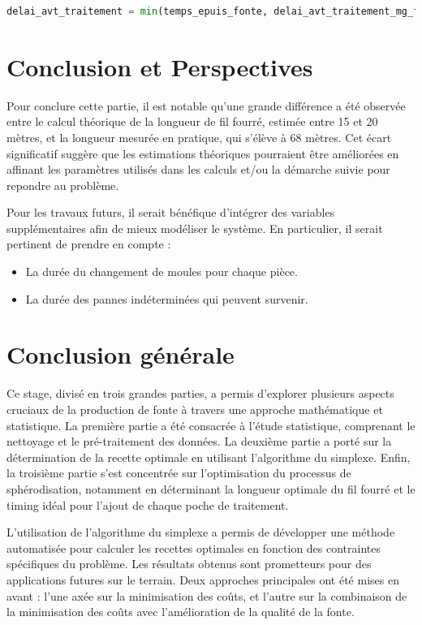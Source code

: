 \documentclass[12pt]{article}
\begin{document}
\begin{lstlisting}[language=Python, caption=Calcul du délai avant traitement optimal]
delai_avt_traitement = min(temps_epuis_fonte, delai_avt_traitement_mg_four)
\end{lstlisting}


\section*{Conclusion et Perspectives}

Pour conclure cette partie, il est notable qu'une grande différence a 
été observée entre le calcul théorique de la longueur de fil fourré, 
estimée entre 15 et 20 mètres, et la longueur mesurée en pratique, qui 
s'élève à 68 mètres. Cet écart significatif suggère que les estimations 
théoriques pourraient être améliorées en affinant les paramètres utilisés 
dans les calculs et/ou la démarche suivie pour repondre au problème.

Pour les travaux futurs, il serait bénéfique d'intégrer des variables 
supplémentaires afin de mieux modéliser le système. En particulier, il 
serait pertinent de prendre en compte :
\begin{itemize}
    \item La durée du changement de moules pour chaque pièce.
    \item La durée des pannes indéterminées qui peuvent survenir.
\end{itemize}


\section*{Conclusion générale}


Ce stage, divisé en trois grandes parties, a permis d'explorer plusieurs 
aspects cruciaux de la production de fonte à travers une approche 
mathématique et statistique. La première partie a été consacrée à l'étude 
statistique, comprenant le nettoyage et le pré-traitement des données. 
La deuxième partie a porté sur la détermination de la recette optimale 
en utilisant l'algorithme du simplexe. Enfin, la troisième partie s'est 
concentrée sur l'optimisation du processus de sphérodisation, notamment 
en déterminant la longueur optimale du fil fourré et le timing idéal pour 
l'ajout de chaque poche de traitement.

L'utilisation de l'algorithme du simplexe a permis de développer une 
méthode automatisée pour calculer les recettes optimales en fonction des 
contraintes spécifiques du problème. Les résultats obtenus sont prometteurs
pour des applications futures sur le terrain. Deux approches principales 
ont été mises en avant : l'une axée sur la minimisation des coûts, et 
l'autre sur la combinaison de la minimisation des coûts avec l'amélioration
de la qualité de la fonte. 
\end{document}
